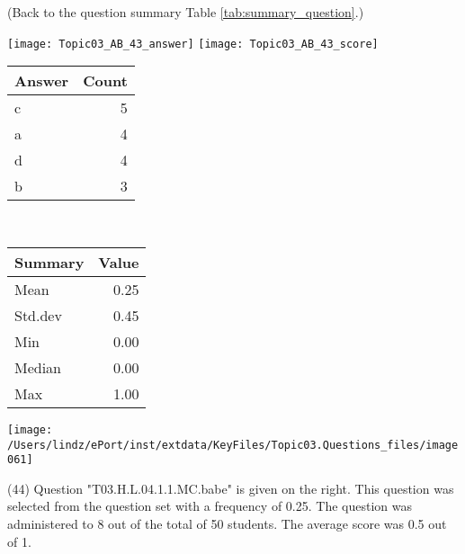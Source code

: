 \documentclass[12pt,english,nohyper]{tufte-handout}\usepackage[]{graphicx}\usepackage[]{color}
\begin{document}
 (Back to the question summary Table \ref{tab:summary_question}.)

\begin{center} \texttt{[image: Topic03\_AB\_43\_answer]} \texttt{[image: Topic03\_AB\_43\_score]} \end{center} 

\begin{center}%
\begin{tabular}{lr}
  \hline
Answer & Count \\ 
  \hline
c &   5 \\ 
  a &   4 \\ 
  d &   4 \\ 
  b &   3 \\ 
   \hline
\end{tabular}
~~~~~~~~%
\begin{tabular}{lr}
  \hline
Summary & Value \\ 
  \hline
Mean & 0.25 \\ 
  Std.dev & 0.45 \\ 
  Min & 0.00 \\ 
  Median & 0.00 \\ 
  Max & 1.00 \\ 
   \hline
\end{tabular}
\end{center}\newpage{}



\vspace{6cm}\begin{marginfigure}\texttt{[image: /Users/lindz/ePort/inst/extdata/KeyFiles/Topic03.Questions\_files/image061]}\end{marginfigure}\vspace{-6cm} (44) Question "T03.H.L.04.1.1.MC.babe" is given on the right. This question was selected from the question set with a frequency of 0.25. The question was administered to 8 out of the total of 50 students. The average score was 0.5 out of 1.
\end{document}
